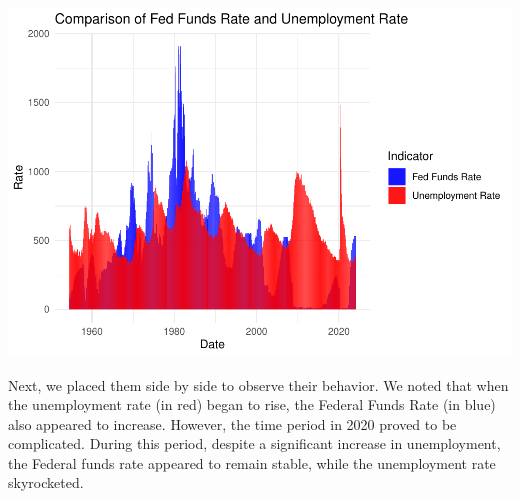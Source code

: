 \documentclass[
]{article}
\begin{document}
\includegraphics{Story_2_Joe_Garcia_files/figure-latex/unnamed-chunk-6-1.pdf}

Next, we placed them side by side to observe their behavior. We noted
that when the unemployment rate (in red) began to rise, the Federal
Funds Rate (in blue) also appeared to increase. However, the time period
in 2020 proved to be complicated. During this period, despite a
significant increase in unemployment, the Federal funds rate appeared to
remain stable, while the unemployment rate skyrocketed.
\end{document}
